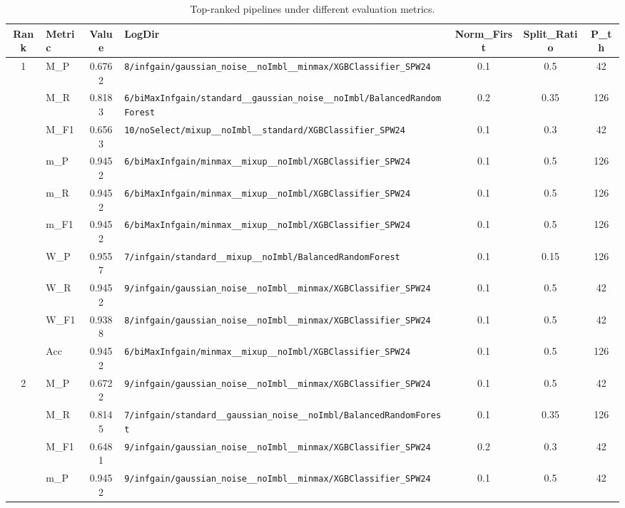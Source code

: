 \begin{table}[htbp]
\caption{Top-ranked pipelines under different evaluation metrics.}
\label{tab:rank_metric_vertical}
\centering
\small
\setlength{\tabcolsep}{4pt}
\begin{tabular}{|c|l|c|>{\ttfamily\footnotesize}p{7.2cm}|c|c|c|}
\hline
Rank & Metric & Value & LogDir & Norm\_First & Split\_Ratio & P\_th \\
\hline
\multirow{10}{*}{1} & M\_P & 0.6762 & \texttt{8/infgain/gaussian\_noise\_\_noImbl\_\_minmax/XGBClassifier\_SPW24} & 0.1 & 0.5  & 42 \\ 
 & M\_R & 0.8183 & \texttt{6/biMaxInfgain/standard\_\_gaussian\_noise\_\_noImbl/BalancedRandomForest} & 0.2 & 0.35  & 126 \\ 
 & M\_F1 & 0.6563 & \texttt{10/noSelect/mixup\_\_noImbl\_\_standard/XGBClassifier\_SPW24} & 0.1 & 0.3  & 42 \\ 
 & m\_P & 0.9452 & \texttt{6/biMaxInfgain/minmax\_\_mixup\_\_noImbl/XGBClassifier\_SPW24} & 0.1 & 0.5  & 126 \\ 
 & m\_R & 0.9452 & \texttt{6/biMaxInfgain/minmax\_\_mixup\_\_noImbl/XGBClassifier\_SPW24} & 0.1 & 0.5  & 126 \\ 
 & m\_F1 & 0.9452 & \texttt{6/biMaxInfgain/minmax\_\_mixup\_\_noImbl/XGBClassifier\_SPW24} & 0.1 & 0.5  & 126 \\ 
 & W\_P & 0.9557 & \texttt{7/infgain/standard\_\_mixup\_\_noImbl/BalancedRandomForest} & 0.1 & 0.15  & 126 \\ 
 & W\_R & 0.9452 & \texttt{9/infgain/gaussian\_noise\_\_noImbl\_\_minmax/XGBClassifier\_SPW24} & 0.1 & 0.5  & 42 \\ 
 & W\_F1 & 0.9388 & \texttt{8/infgain/gaussian\_noise\_\_noImbl\_\_minmax/XGBClassifier\_SPW24} & 0.1 & 0.5  & 42 \\ 
 & Acc & 0.9452 & \texttt{6/biMaxInfgain/minmax\_\_mixup\_\_noImbl/XGBClassifier\_SPW24} & 0.1 & 0.5  & 126 \\ 
\hline
\multirow{10}{*}{2} & M\_P & 0.6722 & \texttt{9/infgain/gaussian\_noise\_\_noImbl\_\_minmax/XGBClassifier\_SPW24} & 0.1 & 0.5  & 42 \\ 
 & M\_R & 0.8145 & \texttt{7/infgain/standard\_\_gaussian\_noise\_\_noImbl/BalancedRandomForest} & 0.1 & 0.35  & 126 \\ 
 & M\_F1 & 0.6481 & \texttt{9/infgain/gaussian\_noise\_\_noImbl\_\_minmax/XGBClassifier\_SPW24} & 0.2 & 0.3  & 42 \\ 
 & m\_P & 0.9452 & \texttt{9/infgain/gaussian\_noise\_\_noImbl\_\_minmax/XGBClassifier\_SPW24} & 0.1 & 0.5  & 42 \\ 

\end{tabular}
\end{table}
